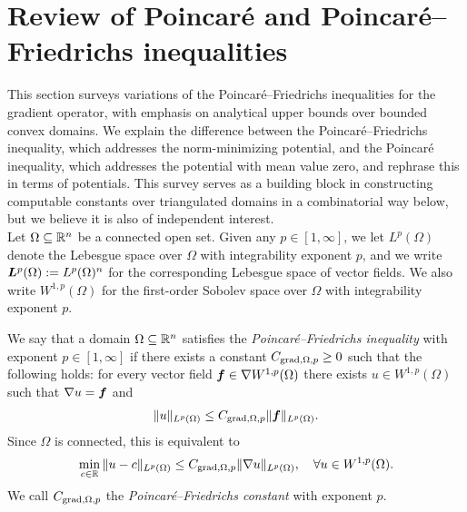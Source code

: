 \documentclass[10pt,a4paper]{article}
\begin{document}
\section{Review of Poincar\'e and Poincar\'e--Friedrichs inequalities}\label{section:poincare}

This section surveys variations of the Poincar\'e--Friedrichs inequalities for the gradient operator,
with emphasis on analytical upper bounds over bounded convex domains. 
We explain the difference between the Poincar\'e--Friedrichs inequality, which addresses the norm-minimizing potential, and the Poincar\'e inequality, which addresses the potential with mean value zero, and rephrase this in terms of potentials. 
This survey serves as a building block in constructing computable constants over triangulated domains in a combinatorial way below, but we believe it is also of independent interest.
\\

Let $\Omega \subseteq {\mathbb R}^{n}$ be a connected open set. 
Given any $p \in [1,\infty]$, we let $L^{p}(\Omega)$ denote the Lebesgue space over $\Omega$ with integrability exponent $p$, and we write $\bm{L}^{p}(\Omega) := L^{p}(\Omega)^{n}$ for the corresponding Lebesgue space of vector fields. 
We also write $W^{1,p}(\Omega)$ for the first-order Sobolev space over $\Omega$ with integrability exponent $p$. 


We say that a domain $\Omega \subseteq {\mathbb R}^{n}$ satisfies the \emph{Poincar\'e--Friedrichs inequality} with exponent $p \in [1,\infty]$
if there exists a constant $C_{\operatorname{grad},\Omega,p} \geq 0$ such that the following holds:
for every vector field $\bm{f} \in \nabla W^{1,p}(\Omega)$ there exists $u \in W^{1,p}(\Omega)$
such that $\nabla u = \bm{f}$ and 
\begin{align}\label{math:inequalitypf:gradient}
    \| u \|_{L^{p}(\Omega)}
    \leq 
    C_{\operatorname{grad},\Omega,p} 
    \| \bm{f} \|_{L^{p}(\Omega)}
    .
\end{align}
Since $\Omega$ is connected, this is equivalent to  
\begin{align*}
    \min_{ c \in {\mathbb R} } \| u - c \|_{L^{p}(\Omega)}
    \leq 
    C_{\operatorname{grad},\Omega,p} 
    \| \nabla u \|_{L^{p}(\Omega)},
    \quad 
    \forall 
    u \in W^{1,p}(\Omega)
    .
\end{align*}
We call $C_{\operatorname{grad},\Omega,p}$ the \emph{Poincar\'e--Friedrichs constant} with exponent $p$. 
\end{document}
